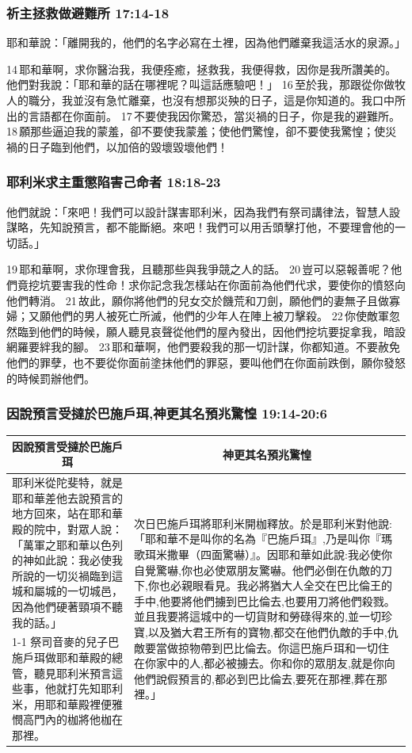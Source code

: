 \subsubsection{祈主拯救做避難所 17:14-18}
耶和華說：「離開我的，他們的名字必寫在土裡，因為他們離棄我這活水的泉源。」 

14 耶和華啊，求你醫治我，我便痊癒，拯救我，我便得救，因你是我所讚美的。
他們對我說：「耶和華的話在哪裡呢？叫這話應驗吧！」 16 至於我，那跟從你做牧人的職分，我並沒有急忙離棄，也沒有想那災殃的日子，這是你知道的。我口中所出的言語都在你面前。 17 不要使我因你驚恐，當災禍的日子，你是我的避難所。 18 願那些逼迫我的蒙羞，卻不要使我蒙羞；使他們驚惶，卻不要使我驚惶；使災禍的日子臨到他們，以加倍的毀壞毀壞他們！

\subsubsection{耶利米求主重懲陷害己命者 18:18-23}
他們就說：「來吧！我們可以設計謀害耶利米，因為我們有祭司講律法，智慧人設謀略，先知說預言，都不能斷絕。來吧！我們可以用舌頭擊打他，不要理會他的一切話。」

19 耶和華啊，求你理會我，且聽那些與我爭競之人的話。 20 豈可以惡報善呢？他們竟挖坑要害我的性命！求你記念我怎樣站在你面前為他們代求，要使你的憤怒向他們轉消。 21 故此，願你將他們的兒女交於饑荒和刀劍，願他們的妻無子且做寡婦；又願他們的男人被死亡所滅，他們的少年人在陣上被刀擊殺。 22 你使敵軍忽然臨到他們的時候，願人聽見哀聲從他們的屋內發出，因他們挖坑要捉拿我，暗設網羅要絆我的腳。 23 耶和華啊，他們要殺我的那一切計謀，你都知道。不要赦免他們的罪孽，也不要從你面前塗抹他們的罪惡，要叫他們在你面前跌倒，願你發怒的時候罰辦他們。
\subsubsection{因說預言受撻於巴施戶珥,神更其名預兆驚惶 19:14-20:6}
\begin{table}[H]
\centering
\begin{tabular}{p{}|p{10.50cm}}\hline\hline
\multicolumn{1}{c|}{因說預言受撻於巴施戶珥}&\multicolumn{1}{c}{神更其名預兆驚惶}\\\hline
耶利米從陀斐特，就是耶和華差他去說預言的地方回來，站在耶和華殿的院中，對眾人說：「萬軍之耶和華以色列的神如此說：我必使我所說的一切災禍臨到這城和屬城的一切城邑，因為他們硬著頸項不聽我的話。」
&\multirow{2}{10.76cm}{次日巴施戶珥將耶利米開枷釋放。於是耶利米對他說:「耶和華不是叫你的名為『巴施戶珥』,乃是叫你『瑪歌珥米撒畢（四面驚嚇）』。因耶和華如此說:我必使你自覺驚嚇,你也必使眾朋友驚嚇。他們必倒在仇敵的刀下,你也必親眼看見。我必將猶大人全交在巴比倫王的手中,他要將他們擄到巴比倫去,也要用刀將他們殺戮。並且我要將這城中的一切貨財和勞碌得來的,並一切珍寶,以及猶大君王所有的寶物,都交在他們仇敵的手中,仇敵要當做掠物帶到巴比倫去。你這巴施戶珥和一切住在你家中的人,都必被擄去。你和你的眾朋友,就是你向他們說假預言的,都必到巴比倫去,要死在那裡,葬在那裡。」}\\\cline{1-1}
祭司音麥的兒子巴施戶珥做耶和華殿的總管，聽見耶利米預言這些事，他就打先知耶利米，用耶和華殿裡便雅憫高門內的枷將他枷在那裡。&\\\hline
\end{tabular}
\end{table}


